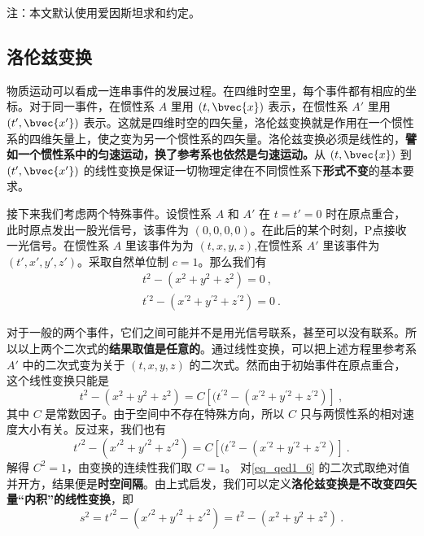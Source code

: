 
注：本文默认使用爱因斯坦求和约定。
\subsection{洛伦兹变换}
物质运动可以看成一连串事件的发展过程。在四维时空里，每个事件都有相应的坐标。对于同一事件，在惯性系 $A$ 里用 $(t, \bvec{x})$ 表示，在惯性系 $A'$ 里用 $(t', \bvec{x'})$ 表示。这就是四维时空的四矢量，洛伦兹变换就是作用在一个惯性系的四维矢量上，使之变为另一个惯性系的四矢量。洛伦兹变换必须是线性的，\textbf{譬如一个惯性系中的匀速运动，换了参考系也依然是匀速运动。}从 $(t, \bvec{x})$ 到 $(t', \bvec{x'})$ 的线性变换是保证一切物理定律在不同惯性系下\textbf{形式不变}的基本要求。

接下来我们考虑两个特殊事件。设惯性系 $A$ 和 $A'$ 在 $t=t'=0$ 时在原点重合，此时原点发出一股光信号，该事件为 $(0,0,0,0)$。在此后的某个时刻，P点接收一光信号。在惯性系 $A$ 里该事件为为 $(t,x,y,z)$,在惯性系 $A'$ 里该事件为 $(t',x',y',z')$。采取自然单位制 $c=1$。那么我们有
\begin{equation}\label{eq_qed1_6}
\begin{array}{c}
t^{2}-(x^{2}+y^{2}+z^{2})=0~,\\
t^{\prime 2}-(x^{\prime 2}+y^{\prime 2}+z^{\prime 2})=0~.
\end{array}
\end{equation}

对于一般的两个事件，它们之间可能并不是用光信号联系，甚至可以没有联系。所以以上两个二次式的\textbf{结果取值是任意的}。通过线性变换，可以把上述方程里参考系 $A'$ 中的二次式变为关于 $(t,x,y,z)$ 的二次式。然而由于初始事件在原点重合，这个线性变换只能是
\begin{equation}\label{eq_qed1_8}
t^{2}-(x^{2}+y^{2}+z^{2})=C\left[(t^{\prime 2}-(x^{\prime 2}+y^{\prime 2}+z^{\prime 2})\right]~,
\end{equation}
其中 $C$ 是常数因子。由于空间中不存在特殊方向，所以 $C$ 只与两惯性系的相对速度大小有关。反过来，我们也有
\begin{equation}
t'^{2}-(x'^{2}+y'^{2}+z'^{2})=C\left[(t^{\prime 2}-(x^{\prime 2}+y^{\prime 2}+z^{\prime 2})\right]~.
\end{equation}
解得 $C^2=1$，由变换的连续性我们取 $C=1$。
对\autoref{eq_qed1_6} 的二次式取绝对值并开方，结果便是\textbf{时空间隔}。由上式启发，我们可以定义\textbf{洛伦兹变换是不改变四矢量“内积”的线性变换}，即
\begin{equation}\label{eq_qed1_7}
s^2=t'^{2}-(x'^{2}+y'^{2}+z'^{2})=t^{2}-(x^{2}+y^{2}+z^{2})~.
\end{equation}

